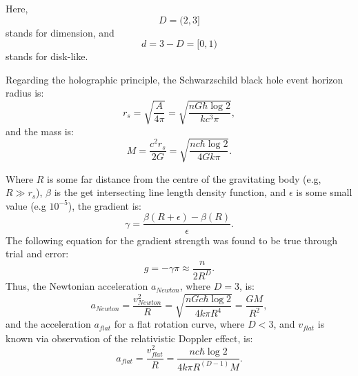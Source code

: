\documentclass[12pt]{article}
\begin{document}
Here, 
\begin{equation}
D = (2, 3]
\end{equation}
stands for dimension, and 
\begin{equation}
d = 3 - D = [0, 1)
\end{equation}
stands for disk-like.

Regarding the holographic principle, the Schwarzschild black hole event horizon radius is:
\begin{equation}
r_s = \sqrt{\frac{A}{4 \pi}} = \sqrt{\frac{n G \hbar \log 2}{k c^3 \pi}},
\end{equation}
and the mass is:
\begin{equation}
M = \frac{c^2 r_s}{2 G} = \sqrt{\frac{n c \hbar \log 2}{4 G k \pi}}. 
\end{equation}

Where $R$ is some far distance from the centre of the gravitating body (e.g, $R \gg r_s$), $\beta$ is the get intersecting line length density function, and $\epsilon$ is some small value (e.g $10^{-5}$), the gradient is:
\begin{equation}
\gamma = \frac{\beta(R + \epsilon) - \beta(R)}{\epsilon}.
\end{equation}
The following equation for the gradient strength was found to be true through trial and error:
\begin{equation}
g = -\gamma \pi \approx \frac{n}{2 R^D}.
\end{equation}
Thus, the Newtonian acceleration $a_{\textit{Newton}}$, where $D = 3$, is:
\begin{equation}
a_{\textit{Newton}} = \frac{v_{\textit{Newton}}^2}{R} = \sqrt{\frac{n G c \hbar \log 2}{4 k \pi R^4}} = \frac{GM}{R^2},
\end{equation}
and the acceleration $a_{\textit{flat}}$ for a flat rotation curve, where $D < 3$, and $v_{\textit{flat}}$ is known via observation of the relativistic Doppler effect, is:
\begin{equation}
a_{\textit{flat}} = \frac{v_{\textit{flat}}^2}{R} = \frac{n c \hbar \log 2}{4 k \pi R^{(D - 1)} M}.
\end{equation}
\end{document}
